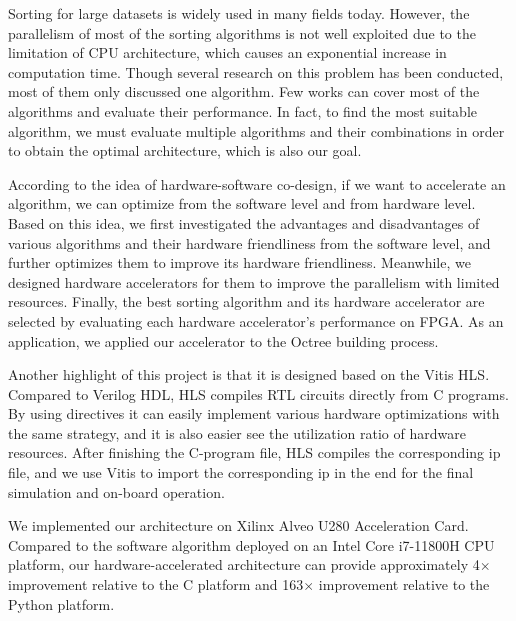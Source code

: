 \begin{abstract*}

Sorting for large datasets is widely used in many fields today. However, the parallelism of most of the sorting algorithms is not well exploited due to the limitation of CPU architecture, which causes an exponential increase in computation time. Though several research on this problem has been conducted, most of them only discussed one algorithm. Few works can cover most of the algorithms and evaluate their performance. In fact, to find the most suitable algorithm, we must evaluate multiple algorithms and their combinations in order to obtain the optimal architecture, which is also our goal.


According to the idea of hardware-software co-design, if we want to accelerate an algorithm, we can optimize from the software level and from hardware level. Based on this idea, we first investigated the advantages and disadvantages of various algorithms and their hardware friendliness from the software level, and further optimizes them to improve its hardware friendliness. Meanwhile, we designed hardware accelerators for them to improve the parallelism with limited resources. Finally, the best sorting algorithm and its hardware accelerator are selected by evaluating each hardware accelerator's performance on FPGA. As an application, we applied our accelerator to the Octree building process.

Another highlight of this project is that it is designed based on the Vitis HLS. Compared to Verilog HDL, HLS compiles RTL circuits directly from C programs. By using directives it can easily implement various hardware optimizations with the same strategy, and it is also easier see the utilization ratio of hardware resources. After finishing the C-program file, HLS compiles the corresponding ip file, and we use Vitis to import the corresponding ip in the end for the final simulation and on-board operation.

We implemented our architecture on Xilinx Alveo U280 Acceleration Card. Compared to the software algorithm deployed on an Intel Core i7-11800H CPU platform, our hardware-accelerated architecture can provide approximately 4$\times$  improvement relative to the C platform and 163$\times$ improvement relative to the Python platform.


\end{abstract*}
